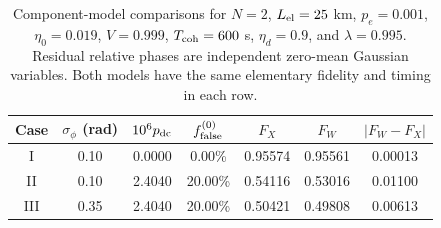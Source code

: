 \begin{table}[tbp]
\caption{\label{tab:werner-cases}Component-model comparisons for $N=2$, $L_{\rm el}=25$ km, $p_e=0.001$, $\eta_0=0.019$, $V=0.999$, $T_{\rm coh}=600$ s, $\eta_d=0.9$, and $\lambda=0.995$. Residual relative phases are independent zero-mean Gaussian variables. Both models have the same elementary fidelity and timing in each row.}
\setlength{\tabcolsep}{2.3pt}
\begin{ruledtabular}
\begin{tabular}{ccccccc}
Case & $\sigma_\phi$ (rad) & $10^6p_{\rm dc}$ & $f_{\rm false}^{(0)}$ & $F_X$ & $F_W$ & $|F_W-F_X|$\\
\hline
I & 0.10 & 0.0000 & 0.00\% & 0.95574 & 0.95561 & 0.00013\\
II & 0.10 & 2.4040 & 20.00\% & 0.54116 & 0.53016 & 0.01100\\
III & 0.35 & 2.4040 & 20.00\% & 0.50421 & 0.49808 & 0.00613\\
\end{tabular}
\end{ruledtabular}
\end{table}
